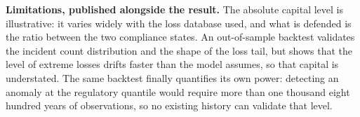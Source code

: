 \documentclass[12pt,a4paper]{article}
\theoremstyle{definition}
\begin{document}
\textbf{Limitations, published alongside the result.} The absolute capital level is
illustrative: it varies widely with the loss database used, and what is defended is
the ratio between the two compliance states. An out-of-sample backtest validates
the incident count distribution and the shape of the loss tail, but shows that the
level of extreme losses drifts faster than the model assumes, so that capital is
understated. The same backtest finally quantifies its own power: detecting an
anomaly at the regulatory quantile would require more than one thousand eight
hundred years of observations, so no existing history can validate that level.
\end{document}
